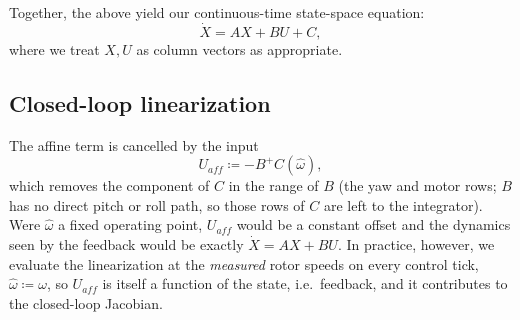 \documentclass{article}
\begin{document}
Together, the above yield our continuous-time state-space equation:
\begin{equation}
    \dot{X} = AX + BU + C,
\end{equation}
where we treat $X, U$ as column vectors as appropriate.

\subsection{Closed-loop linearization}
The affine term is cancelled by the input
\begin{equation}
    U_{aff} \coloneqq -B^+ C(\widehat{\omega}),
\end{equation}
which removes the component of $C$ in the range of $B$ (the yaw and motor rows; $B$ has no direct pitch or roll path, so those rows of $C$ are left to the integrator).  Were $\widehat{\omega}$ a fixed operating point, $U_{aff}$ would be a constant offset and the dynamics seen by the feedback would be exactly $\dot{X} = AX + BU$.  In practice, however, we evaluate the linearization at the \emph{measured} rotor speeds on every control tick, $\widehat{\omega} \coloneqq \omega$, so $U_{aff}$ is itself a function of the state, i.e.\ feedback, and it contributes to the closed-loop Jacobian.
\end{document}
